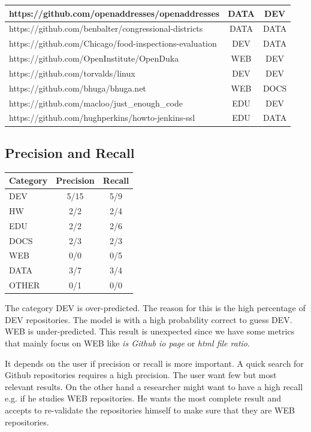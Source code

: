 \documentclass[a4paper]{scrartcl}
\begin{document}
\begin{center}
\begin{tabular}{ l | c | c }
		https://github.com/openaddresses/openaddresses & DATA & DEV \\ \hline
		https://github.com/benbalter/congressional-districts & DATA & DATA \\ \hline
		https://github.com/Chicago/food-inspections-evaluation & DEV & DATA \\ \hline
		https://github.com/OpenInstitute/OpenDuka & WEB & DEV \\ \hline
		https://github.com/torvalds/linux & DEV & DEV \\ \hline
		https://github.com/bhuga/bhuga.net & WEB & DOCS \\ \hline
		https://github.com/macloo/just\_enough\_code & EDU & DEV \\ \hline
		https://github.com/hughperkins/howto-jenkins-ssl & EDU & DATA \\ \hline
	\end{tabular}
\end{center}

\subsection{Precision and Recall}

\begin{center}
	\begin{tabular}{ l | c | c }
		Category & Precision & Recall \\ \hline
		DEV & 5/15 & 5/9  \\ \hline
		HW & 2/2 & 2/4 \\ \hline
		EDU & 2/2 & 2/6 \\ \hline
		DOCS & 2/3 & 2/3 \\ \hline
		WEB & 0/0 & 0/5 \\ \hline
		DATA & 3/7 & 3/4 \\ \hline
		OTHER & 0/1 & 0/0 \\ \hline
	\end{tabular}
\end{center}

The category DEV is over-predicted. The reason for this is the high percentage of DEV repositories. The model is with a high probability correct to guess DEV. WEB is under-predicted. This result is unexpected since we have some metrics that mainly focus on WEB like \textit{is Github io page} or \textit{html file ratio}.

It depends on the user if precision or recall is more important. A quick search for Github repositories requires a high precision. The user want few but most relevant results. On the other hand a researcher might want to have a high recall e.g. if he studies WEB repositories. He wants the most complete result and accepts to re-validate the repositories himself to make sure that they are WEB repositories.
\end{document}
